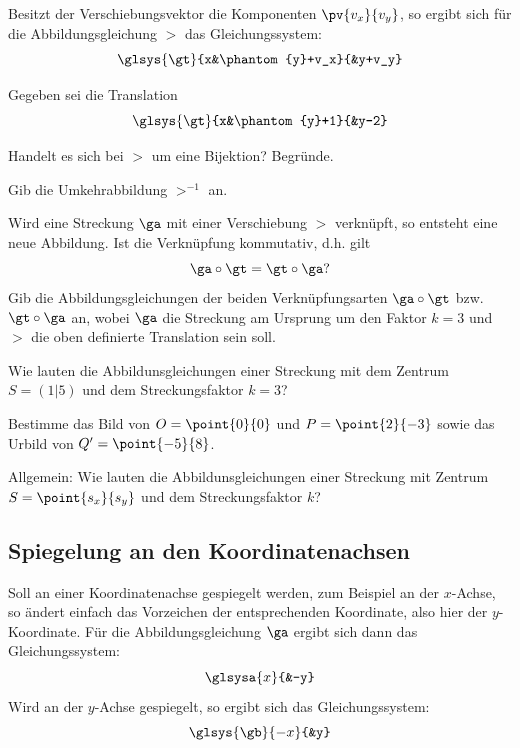 \documentclass[%
11pt,%
twoside,%
titlepage,%
german,%
headsepline%
]{scrartcl}
\begin{document}
Besitzt der Verschiebungsvektor die Komponenten $\pv{v_x}{v_y}$, so ergibt sich für die Abbildungsgleichung $\gt$ das Gleichungssystem:
$$\glsys{\gt}{x&\phantom{y}+v_x}{&y+v_y}$$

\begin{ueb}
Gegeben sei die Translation
$$\glsys{\gt}{x&\phantom{y}+1}{&y-2}$$
\begin{enumeratea}
\item Handelt es sich bei $\gt$ um eine Bijektion? Begründe.
\item Gib die Umkehrabbildung $\gt^{-1}$ an.
\item Wird eine Streckung $\ga$ mit einer Verschiebung $\gt$ verknüpft, so entsteht eine neue Abbildung. Ist die Verknüpfung kommutativ, d.h. gilt
$$\ga\circ\gt=\gt\circ\ga?$$
Gib die Abbildungsgleichungen der beiden Verknüpfungsarten $\ga\circ\gt$ bzw. $\gt\circ\ga$ an, wobei $\ga$ die Streckung am Ursprung um den Faktor $k = 3$ und $\gt$ die oben definierte Translation sein soll.
\item Wie lauten die Abbildunsgleichungen einer Streckung mit dem Zentrum $S=(1|5)$ und dem Streckungsfaktor $k = 3$?

Bestimme das Bild von $O=\point{0}{0}$ und $P =\point{2}{-3}$ sowie das Urbild von $Q' =\point{-5}{8}$.
\item Allgemein: Wie lauten die Abbildunsgleichungen einer Streckung mit Zentrum $S =\point{s_x}{s_y}$ und dem Streckungsfaktor $k$?
\end{enumeratea}
\end{ueb}

\subsection{Spiegelung an den Koordinatenachsen}
Soll an einer Koordinatenachse gespiegelt werden, zum Beispiel an der $x$-Achse, so ändert einfach das Vorzeichen der entsprechenden Koordinate, also hier der $y$-Koordinate. Für die Abbildungsgleichung $\ga$ ergibt sich dann das Gleichungssystem:
$$\glsysa{x}{&-y}$$
Wird an der $y$-Achse gespiegelt, so ergibt sich das Gleichungssystem:
$$\glsys{\gb}{-x}{&y}$$
\end{document}
